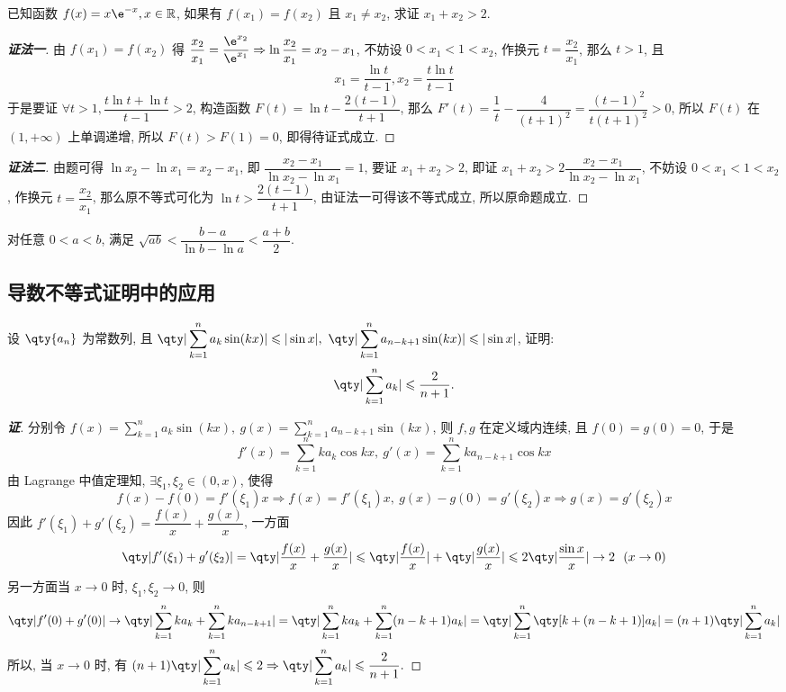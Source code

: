 \begin{example}
    已知函数 $f(x)=x\e^{-x},x\in\mathbb{R}$, 如果有 $f(x_1)=f(x_2)$ 且 $x_1\neq x_2$, 求证 $x_1+x_2>2.$
\end{example}
\begin{proof}[{\songti \textbf{证法一}}]
    由 $f(x_1)=f(x_2)$ 得 $\dfrac{x_2}{x_1}=\dfrac{\e^{x_2}}{\e^{x_1}}\Rightarrow \ln\dfrac{x_2}{x_1}=x_2-x_1$, 不妨设 $0<x_1<1<x_2$, 作换元 $t=\dfrac{x_2}{x_1}$, 那么 $t>1$, 且 
    $$x_1=\dfrac{\ln t}{t-1},x_2=\dfrac{t\ln t}{t-1}$$
    于是要证 $\forall t>1,\dfrac{t\ln t+\ln t}{t-1}>2$, 构造函数 $F(t)=\ln t-\dfrac{2(t-1)}{t+1}$, 那么 $F'(t)=\dfrac{1}{t}-\dfrac{4}{(t+1)^2}=\dfrac{(t-1)^2}{t(t+1)^2}>0$, 所以 $F(t)$ 在 $(1,+\infty)$ 上单调递增, 所以 $F(t)>F(1)=0$, 即得待证式成立.
\end{proof}
\begin{proof}[{\songti \textbf{证法二}}]
    由题可得 $\ln x_2-\ln x_1=x_2-x_1$, 即 $\dfrac{x_2-x_1}{\ln x_2-\ln x_1}=1$, 要证 $x_1+x_2>2$, 即证 $x_1+x_2>2\dfrac{x_2-x_1}{\ln x_2-\ln x_1}$, 
    不妨设 $0<x_1<1<x_2$, 作换元 $t=\dfrac{x_2}{x_1}$, 那么原不等式可化为 $\ln t>\dfrac{2(t-1)}{t+1}$, 由证法一可得该不等式成立, 所以原命题成立.
\end{proof}

\begin{theorem}
    对任意 $0<a<b$, 满足 $\sqrt{ab}<\dfrac{b-a}{\ln b-\ln a}<\dfrac{a+b}{2}.$
\end{theorem}

\subsection{导数不等式证明中的应用}

\begin{example}
    设 $\qty{a_n}$ 为常数列, 且 $\displaystyle\qty|\sum_{k=1}^{n}a_k\sin(kx)|\leqslant |\sin x|,~\qty|\sum_{k=1}^{n}a_{n-k+1}\sin(kx)|\leqslant |\sin x|$, 证明: $$\displaystyle \qty|\sum_{k=1}^{n}a_k|\leqslant \dfrac{2}{n+1}.$$
\end{example}
\begin{proof}[{\songti \textbf{证}}]
    分别令 $\displaystyle f(x)=\sum_{k=1}^{n}a_k\sin(kx),~g(x)=\sum_{k=1}^{n}a_{n-k+1}\sin(kx)$, 则 $f,g$ 在定义域内连续, 且 $f(0)=g(0)=0$, 于是
    $$f'(x)=\sum_{k=1}^{n}ka_k\cos kx,~g'(x)=\sum_{k=1}^{n}ka_{n-k+1}\cos kx$$
    由 Lagrange 中值定理知, $\exists\xi_1,\xi_2\in(0,x)$, 使得
    $$f(x)-f(0)=f'(\xi_1)x\Rightarrow f(x)=f'(\xi_1)x,~g(x)-g(0)=g'(\xi_2)x\Rightarrow g(x)=g'(\xi_2)x$$
    因此 $f'(\xi_1)+g'(\xi_2)=\dfrac{f(x)}{x}+\dfrac{g(x)}{x}$, 一方面
    $$\qty|f'(\xi_1)+g'(\xi_2)|=\qty|\dfrac{f(x)}{x}+\dfrac{g(x)}{x}|\leqslant \qty|\dfrac{f(x)}{x}|+\qty|\dfrac{g(x)}{x}|\leqslant 2\qty|\dfrac{\sin x}{x}|\to 2~~(x\to0)$$
    另一方面当 $x\to0$ 时, $\xi_1,\xi_2\to0$, 则
    $$\qty|f'(0)+g'(0)|\to\qty|\sum_{k=1}^{n}ka_k+\sum_{k=1}^{n}ka_{n-k+1}|=\qty|\sum_{k=1}^{n}ka_k+\sum_{k=1}^{n}(n-k+1)a_k|=\qty|\sum_{k=1}^{n}\qty[k+(n-k+1)]a_k|=(n+1)\qty|\sum_{k=1}^{n}a_k|$$
    所以, 当 $x\to0$ 时, 有 $\displaystyle (n+1)\qty|\sum_{k=1}^{n}a_k|\leqslant 2\Rightarrow \qty|\sum_{k=1}^{n}a_k|\leqslant \dfrac{2}{n+1}.$
\end{proof}


